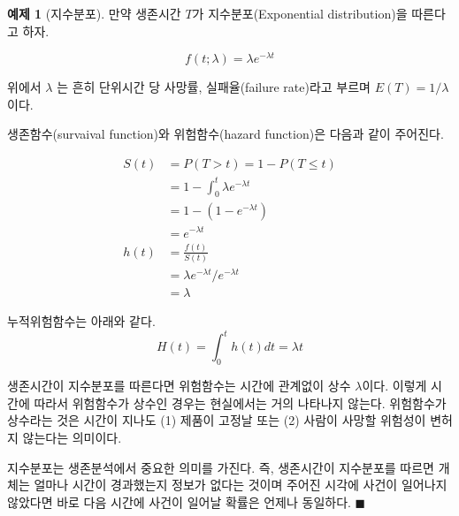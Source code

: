 \documentclass[
]{book}
\theoremstyle{definition}
\theoremstyle{definition}
\newtheorem{example}{예제}[chapter]
\theoremstyle{definition}
\theoremstyle{definition}
\theoremstyle{remark}
\begin{document}
\begin{example}[지수분포]
\protect\hypertarget{exm:unnamed-chunk-3}{}{\label{exm:unnamed-chunk-3} {} }
만약 생존시간 \(T\)가 지수분포(Exponential distribution)을 따른다고 하자.

\[ f(t; \lambda) = \lambda e^{-\lambda t} \]

위에서 \(\lambda\) 는 흔히 단위시간 당 사망률, 실패율(failure rate)라고 부르며 \(E(T) = 1/\lambda\)이다.

생존함수(survaival function)와 위험함수(hazard function)은 다음과 같이 주어진다.

\begin{align*}
S(t) & = P(T>t)  = 1 - P(T \le t) \\
    & = 1 - \int_0^t \lambda e^{-\lambda t} \\
    & = 1 - (1-e^{-\lambda t} ) \\
    & = e^{-\lambda t} \\
h(t) & = \frac{f(t)}{S(t)} \\
    & = \lambda e^{-\lambda t}  / e^{-\lambda t} \\
    & = \lambda
\end{align*}

누적위험함수는 아래와 같다.
\[ H(t) = \int_0^t h(t) dt = \lambda t \]

생존시간이 지수분포를 따른다면 위험함수는 시간에 관계없이 상수 \(\lambda\)이다. 이렇게
시간에 따라서 위험함수가 상수인 경우는 현실에서는 거의 나타나지 않는다.
위험함수가 상수라는 것은 시간이 지나도 (1) 제품이 고정날 또는 (2) 사람이 사망할 위험성이 변허지 않는다는 의미이다.

지수분포는 생존분석에서 중요한 의미를 가진다. 즉, 생존시간이 지수분포를 따르면 개체는 얼마나 시간이 경과했는지 정보가 없다는 것이며 주어진 시각에 사건이 일어나지 않았다면 바로 다음 시간에 사건이 일어날
확률은 언제나 동일하다. \(\blacksquare\)
\end{example}
\end{document}
